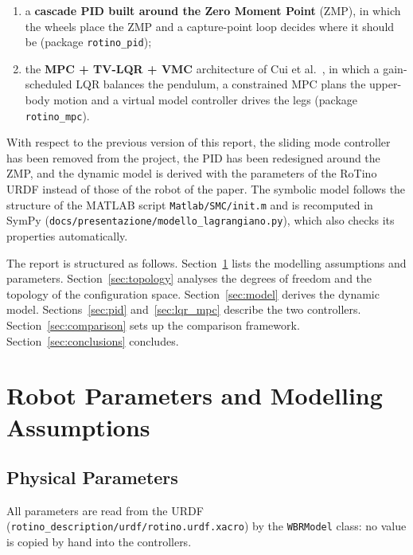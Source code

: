 \documentclass[11pt,a4paper]{article}
\begin{document}
\begin{enumerate}[leftmargin=*]
    \item a \textbf{cascade PID built around the Zero Moment Point} (ZMP), in which the wheels
          place the ZMP and a capture-point loop decides where it should be
          (package \texttt{rotino\_pid});
    \item the \textbf{MPC + TV-LQR + VMC} architecture of Cui et al.~\cite{cui2022}, in which a
          gain-scheduled LQR balances the pendulum, a constrained MPC plans the upper-body motion
          and a virtual model controller drives the legs (package \texttt{rotino\_mpc}).
\end{enumerate}

With respect to the previous version of this report, the sliding mode controller has been
removed from the project, the PID has been redesigned around the ZMP, and the dynamic model is
derived with the parameters of the RoTino URDF instead of those of the robot of the paper.
The symbolic model follows the structure of the MATLAB script \texttt{Matlab/SMC/init.m} and
is recomputed in SymPy (\texttt{docs/presentazione/modello\_lagrangiano.py}), which also checks
its properties automatically.

The report is structured as follows.  Section~\ref{sec:params} lists the modelling
assumptions and parameters.  Section~\ref{sec:topology} analyses the degrees of freedom and
the topology of the configuration space.  Section~\ref{sec:model} derives the dynamic model.
Sections~\ref{sec:pid} and~\ref{sec:lqr_mpc} describe the two controllers.
Section~\ref{sec:comparison} sets up the comparison framework.  Section~\ref{sec:conclusions}
concludes.


\section{Robot Parameters and Modelling Assumptions}
\label{sec:params}

\subsection{Physical Parameters}

All parameters are read from the URDF (\texttt{rotino\_description/urdf/rotino.urdf.xacro})
by the \texttt{WBRModel} class: no value is copied by hand into the controllers.
\end{document}
